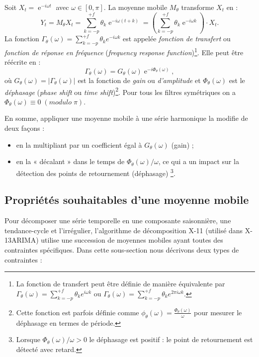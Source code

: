\documentclass[
  12pt,
  french,
  12pt,a4paper]{article}
\DeclareMathOperator{\e}{e}
\newcommand\1{\mathds{1}}
\begin{document}
Soit \(X_t=\e^{-i\omega t}\) avec \(\omega\in[0,\pi]\). La moyenne mobile \(M_\theta\) transforme \(X_t\) en :
\[
Y_t = M_{\theta}X_t = \sum_{k=-p}^{+f} \theta_k \e^{-i \omega (t+k)}
= \left(\sum_{k=-p}^{+f} \theta_k \e^{-i \omega k}\right)\cdot X_t.
\]
La fonction \(\Gamma_\theta(\omega)=\sum_{k=-p}^{+f} \theta_k e^{-i \omega k}\) est appelée \emph{fonction de transfert} ou \emph{fonction de réponse en fréquence} (\emph{frequency response function})\footnote{
  La fonction de transfert peut être définie de manière équivalente par \(\Gamma_\theta(\omega)=\sum_{k=-p}^{+f} \theta_k e^{i \omega k}\) ou \(\Gamma_\theta(\omega)=\sum_{k=-p}^{+f} \theta_k e^{2\pi i \omega k}\).}.
Elle peut être réécrite en :
\[
\Gamma_\theta(\omega) = G_\theta(\omega)\e^{-i\Phi_\theta(\omega)},
\]
où \(G_\theta(\omega)=\lvert\Gamma_\theta(\omega)\rvert\) est la fonction de \emph{gain} ou \emph{d'amplitude} et \(\Phi_\theta(\omega)\) est le \emph{déphasage} (\emph{phase shift} ou \emph{time shift})\footnote{
  Cette fonction est parfois définie comme \(\phi_\theta(\omega)=\frac{\Phi_\theta(\omega)}{\omega}\) pour mesurer le déphasage en termes de période.}.
Pour tous les filtres symétriques on a \(\Phi_\theta(\omega)\equiv 0 \;(modulo\;{\pi})\).

En somme, appliquer une moyenne mobile à une série harmonique la modifie de deux façons :

\begin{itemize}
\item
  en la multipliant par un coefficient égal à \(G_{\theta}\left(\omega\right)\) (gain) ;
\item
  en la « décalant » dans le temps de \(\Phi_\theta(\omega)/\omega\), ce qui a un impact sur la détection des points de retournement (déphasage) \footnote{
    Lorsque \(\Phi_\theta(\omega)/\omega>0\) le déphasage est positif : le point de retournement est détecté avec retard.}.
\end{itemize}

\hypertarget{propriuxe9tuxe9s-souhaitables-dune-moyenne-mobile}{%
\subsection{Propriétés souhaitables d'une moyenne mobile}\label{propriuxe9tuxe9s-souhaitables-dune-moyenne-mobile}}

Pour décomposer une série temporelle en une composante saisonnière, une tendance-cycle et l'irrégulier, l'algorithme de décomposition X-11 (utilisé dans X-13ARIMA) utilise une succession de moyennes mobiles ayant toutes des contraintes spécifiques.
Dans cette sous-section nous décrivons deux types de contraintes :
\end{document}
